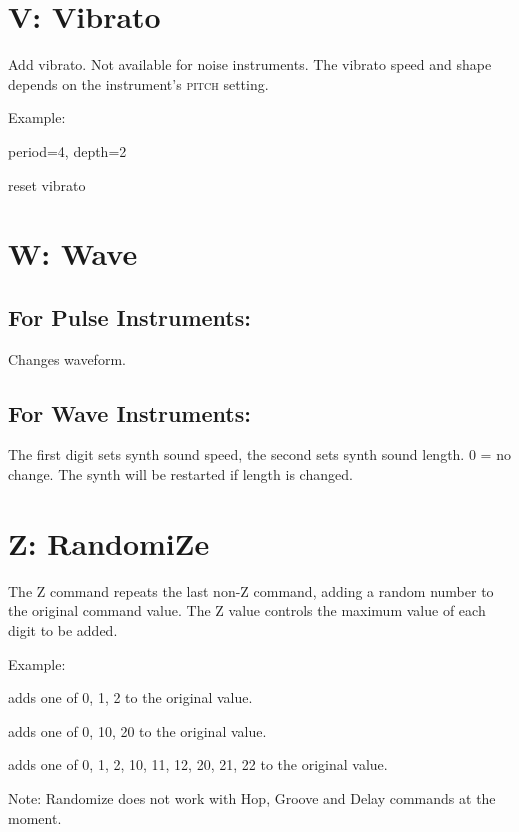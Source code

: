 \section{V: Vibrato}

Add vibrato. Not available for noise instruments. The vibrato speed and shape depends on the instrument's \textsc{pitch} setting.

\begin{description}
\item Example:
\item[V42] period=4, depth=2
\item[V00] reset vibrato
\end{description}

\section{W: Wave}

\subsection{For Pulse Instruments:}
Changes waveform.

\subsection{For Wave Instruments:}
The first digit sets synth sound speed, the second sets synth sound length. 0 = no change. The synth will be restarted if length is changed.

\section{Z: RandomiZe}

The Z command repeats the last non-Z command, adding a random number to the original command value. The Z value controls the maximum value of each digit to be added.

\begin{description}
\item Example:
\item[Z02] adds one of 0, 1, 2 to the original value.
\item[Z20] adds one of 0, 10, 20 to the original value.
\item[Z22] adds one of 0, 1, 2, 10, 11, 12, 20, 21, 22 to the original value.
\end{description}

Note: Randomize does not work with Hop, Groove and Delay commands at the moment.
